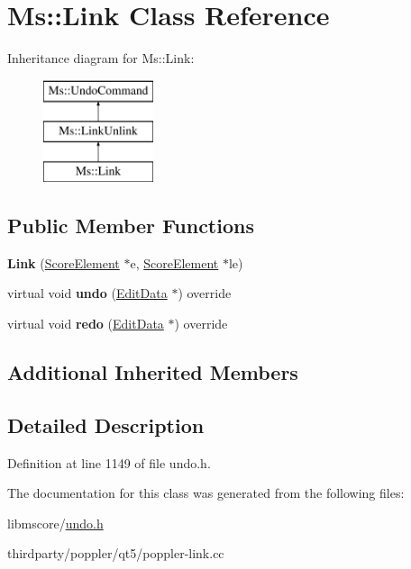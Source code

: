 \hypertarget{class_ms_1_1_link}{}\section{Ms\+:\+:Link Class Reference}
\label{class_ms_1_1_link}
Inheritance diagram for Ms\+:\+:Link\+:\begin{figure}[H]
\begin{center}
\leavevmode
\includegraphics[height=3.000000cm]{class_ms_1_1_link}
\end{center}
\end{figure}
\subsection*{Public Member Functions}
\begin{DoxyCompactItemize}
\item 
\mbox{\label{class_ms_1_1_link_a089866afbcd847e6fea80ff88e886a4a}} 
{\bfseries Link} (\hyperlink{class_ms_1_1_score_element}{Score\+Element} $\ast$e, \hyperlink{class_ms_1_1_score_element}{Score\+Element} $\ast$le)
\item 
\mbox{\label{class_ms_1_1_link_adb8d9744042481986e53d6b350e0dbcd}} 
virtual void {\bfseries undo} (\hyperlink{class_ms_1_1_edit_data}{Edit\+Data} $\ast$) override
\item 
\mbox{\label{class_ms_1_1_link_a7b0f049de6c374d5bef2e3eed30c9d86}} 
virtual void {\bfseries redo} (\hyperlink{class_ms_1_1_edit_data}{Edit\+Data} $\ast$) override
\end{DoxyCompactItemize}
\subsection*{Additional Inherited Members}


\subsection{Detailed Description}


Definition at line 1149 of file undo.\+h.



The documentation for this class was generated from the following files\+:\begin{DoxyCompactItemize}
\item 
libmscore/\hyperlink{undo_8h}{undo.\+h}\item 
thirdparty/poppler/qt5/poppler-\/link.\+cc\end{DoxyCompactItemize}
